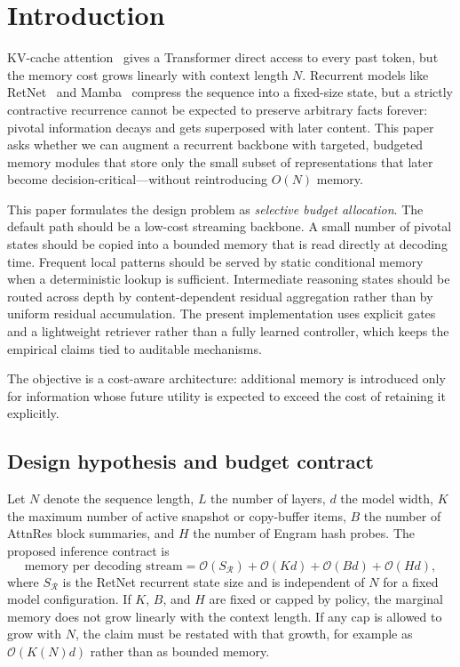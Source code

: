 \documentclass[preprint,12pt]{elsarticle}
\newcommand{\Ret}{\mathcal{R}}
\newcommand{\Oh}{\mathcal{O}}
\begin{document}
\section{Introduction}

KV-cache attention~\cite{vaswani2017} gives a Transformer direct access to every past token, but the memory cost grows linearly with context length $N$. Recurrent models like RetNet~\cite{retnet} and Mamba~\cite{mamba} compress the sequence into a fixed-size state, but a strictly contractive recurrence cannot be expected to preserve arbitrary facts forever: pivotal information decays and gets superposed with later content. This paper asks whether we can augment a recurrent backbone with targeted, budgeted memory modules that store only the small subset of representations that later become decision-critical---without reintroducing $O(N)$ memory.

This paper formulates the design problem as \emph{selective budget allocation}. The default path should be a low-cost streaming backbone. A small number of pivotal states should be copied into a bounded memory that is read directly at decoding time. Frequent local patterns should be served by static conditional memory when a deterministic lookup is sufficient. Intermediate reasoning states should be routed across depth by content-dependent residual aggregation rather than by uniform residual accumulation. The present implementation uses explicit gates and a lightweight retriever rather than a fully learned controller, which keeps the empirical claims tied to auditable mechanisms.

The objective is a cost-aware architecture: additional memory is introduced only for information whose future utility is expected to exceed the cost of retaining it explicitly.

\subsection{Design hypothesis and budget contract}

Let $N$ denote the sequence length, $L$ the number of layers, $d$ the model width, $K$ the maximum number of active snapshot or copy-buffer items, $B$ the number of AttnRes block summaries, and $H$ the number of Engram hash probes. The proposed inference contract is
\begin{equation}
\label{eq:budget-contract}
\text{memory per decoding stream}
= \Oh(S_{\Ret}) + \Oh(Kd) + \Oh(Bd) + \Oh(Hd),
\end{equation}
where $S_{\Ret}$ is the RetNet recurrent state size and is independent of $N$ for a fixed model configuration. If $K$, $B$, and $H$ are fixed or capped by policy, the marginal memory does not grow linearly with the context length. If any cap is allowed to grow with $N$, the claim must be restated with that growth, for example as $\Oh(K(N)d)$ rather than as bounded memory.
\end{document}
